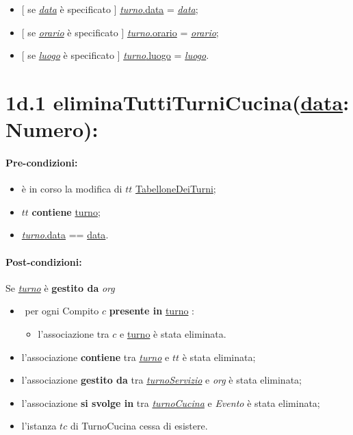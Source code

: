  \begin{itemize}
     \item $[$ se \underline{\textit{data}} è specificato $]$ \underline{\textit{turno}.data} = \underline{\textit{data}};

    \item $[$ se \underline{\textit{orario}} è specificato $]$ \underline{\textit{turno}.orario} = \underline{\textit{orario}};

    \item $[$ se \underline{\textit{luogo}} è specificato $]$ \underline{\textit{turno}.luogo} = \underline{\textit{luogo}}.

\end{itemize}

\section*{1d.1 eliminaTuttiTurniCucina(\underline{data}: Numero):}

\paragraph{Pre-condizioni:}
\begin{itemize}
 \item è in corso la modifica di $tt$ \underline{TabelloneDeiTurni};
 \item $tt$ \textbf{contiene} \underline{turno};
 \item \underline{\textit{turno}.data} == \underline{data}.
\end{itemize}

\paragraph{Post-condizioni:} Se \underline{\textit{turno}} è \textbf{gestito da} {\textit{org}}

\begin{itemize}
   \item \textlangle $ $ per ogni Compito $c$ \textbf{presente in} \underline{turno} \textrangle:
    \begin{itemize}
        \item l'associazione tra $c$ e \underline{turno} è stata eliminata.
    \end{itemize}
    \item l'associazione \textbf{contiene} tra \underline{\textit{turno}} e $tt$ è stata eliminata;
    \item l'associazione \textbf{gestito da} tra \underline{\textit{turnoServizio}} e \textit{org} è stata eliminata;
\item l'associazione \textbf{si svolge in} tra \underline{\textit{turnoCucina}} e \textit{Evento} è stata eliminata;
    \item l'istanza $tc$ di TurnoCucina cessa di esistere.
\end{itemize}

